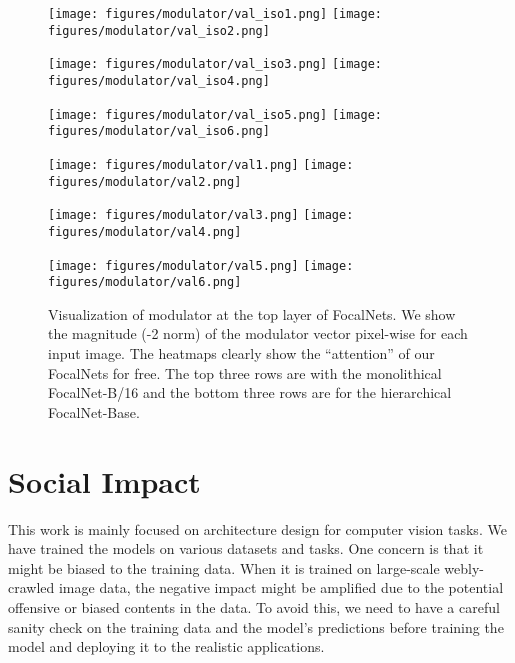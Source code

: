 \documentclass{article}
\begin{document}
\begin{figure}[t]
    \centering
    \texttt{[image: figures/modulator/val\_iso1.png]}
    \texttt{[image: figures/modulator/val\_iso2.png]}

    \texttt{[image: figures/modulator/val\_iso3.png]}
    \texttt{[image: figures/modulator/val\_iso4.png]}

    \texttt{[image: figures/modulator/val\_iso5.png]}
    \texttt{[image: figures/modulator/val\_iso6.png]}
    
    \texttt{[image: figures/modulator/val1.png]}
    \texttt{[image: figures/modulator/val2.png]}

    \texttt{[image: figures/modulator/val3.png]}
    \texttt{[image: figures/modulator/val4.png]}

    \texttt{[image: figures/modulator/val5.png]}
    \texttt{[image: figures/modulator/val6.png]}    

    \caption{Visualization of modulator at the top layer of FocalNets. We show the magnitude (-2 norm) of the modulator vector pixel-wise for each input image. The heatmaps clearly show the ``attention'' of our FocalNets for free. The top three rows are with the monolithical FocalNet-B/16 and the bottom three rows are for the hierarchical FocalNet-Base.}
    \label{fig:modulator_supp}
\end{figure}

\section{Social Impact}



This work is mainly focused on architecture design for computer vision tasks. We have trained the models on various datasets and tasks. One concern is that it might be biased to the training data. When it is trained on large-scale webly-crawled image data, the negative impact might be amplified due to the potential offensive or biased contents in the data. To avoid this, we need to have a careful sanity check on the training data and the model's predictions before training the model and deploying it to the realistic applications.








 
\end{document}

